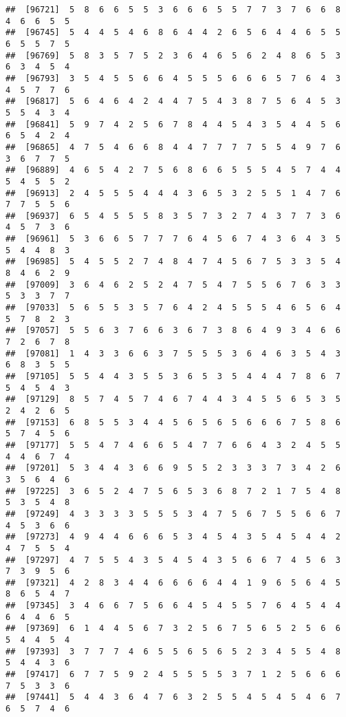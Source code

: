 \documentclass[
]{book}
\begin{document}
\begin{verbatim}
##  [96721]  5  8  6  6  5  5  3  6  6  6  5  5  7  7  3  7  6  6  8  4  6  6  5  5
##  [96745]  5  4  4  5  4  6  8  6  4  4  2  6  5  6  4  4  6  5  5  6  5  5  7  5
##  [96769]  5  8  3  5  7  5  2  3  6  4  6  5  6  2  4  8  6  5  3  6  3  4  5  4
##  [96793]  3  5  4  5  5  6  6  4  5  5  5  6  6  6  5  7  6  4  3  4  5  7  7  6
##  [96817]  5  6  4  6  4  2  4  4  7  5  4  3  8  7  5  6  4  5  3  5  5  4  3  4
##  [96841]  5  9  7  4  2  5  6  7  8  4  4  5  4  3  5  4  4  5  6  6  5  4  2  4
##  [96865]  4  7  5  4  6  6  8  4  4  7  7  7  7  5  5  4  9  7  6  3  6  7  7  5
##  [96889]  4  6  5  4  2  7  5  6  8  6  6  5  5  5  4  5  7  4  4  5  4  5  5  2
##  [96913]  2  4  5  5  5  4  4  4  3  6  5  3  2  5  5  1  4  7  6  7  7  5  5  6
##  [96937]  6  5  4  5  5  5  8  3  5  7  3  2  7  4  3  7  7  3  6  4  5  7  3  6
##  [96961]  5  3  6  6  5  7  7  7  6  4  5  6  7  4  3  6  4  3  5  5  4  4  8  3
##  [96985]  5  4  5  5  2  7  4  8  4  7  4  5  6  7  5  3  3  5  4  8  4  6  2  9
##  [97009]  3  6  4  6  2  5  2  4  7  5  4  7  5  5  6  7  6  3  3  5  3  3  7  7
##  [97033]  5  6  5  5  3  5  7  6  4  2  4  5  5  5  4  6  5  6  4  5  7  8  2  3
##  [97057]  5  5  6  3  7  6  6  3  6  7  3  8  6  4  9  3  4  6  6  7  2  6  7  8
##  [97081]  1  4  3  3  6  6  3  7  5  5  5  3  6  4  6  3  5  4  3  6  8  3  5  5
##  [97105]  5  5  4  4  3  5  5  3  6  5  3  5  4  4  4  7  8  6  7  5  4  5  4  3
##  [97129]  8  5  7  4  5  7  4  6  7  4  4  3  4  5  5  6  5  3  5  2  4  2  6  5
##  [97153]  6  8  5  5  3  4  4  5  6  5  6  5  6  6  6  7  5  8  6  5  7  4  5  6
##  [97177]  5  5  4  7  4  6  6  5  4  7  7  6  6  4  3  2  4  5  5  4  4  6  7  4
##  [97201]  5  3  4  4  3  6  6  9  5  5  2  3  3  3  7  3  4  2  6  3  5  6  4  6
##  [97225]  3  6  5  2  4  7  5  6  5  3  6  8  7  2  1  7  5  4  8  5  3  5  4  8
##  [97249]  4  3  3  3  3  5  5  5  3  4  7  5  6  7  5  5  6  6  7  4  5  3  6  6
##  [97273]  4  9  4  4  6  6  6  5  3  4  5  4  3  5  4  5  4  4  2  4  7  5  5  4
##  [97297]  4  7  5  5  4  3  5  4  5  4  3  5  6  6  7  4  5  6  3  7  3  9  5  6
##  [97321]  4  2  8  3  4  4  6  6  6  6  4  4  1  9  6  5  6  4  5  8  6  5  4  7
##  [97345]  3  4  6  6  7  5  6  6  4  5  4  5  5  7  6  4  5  4  4  6  4  4  6  5
##  [97369]  6  1  4  4  5  6  7  3  2  5  6  7  5  6  5  2  5  6  6  5  4  4  5  4
##  [97393]  3  7  7  7  4  6  5  5  6  5  6  5  2  3  4  5  5  4  8  5  4  4  3  6
##  [97417]  6  7  7  5  9  2  4  5  5  5  5  3  7  1  2  5  6  6  6  7  5  3  3  6
##  [97441]  5  4  4  3  6  4  7  6  3  2  5  5  4  5  4  5  4  6  7  6  5  7  4  6

\end{verbatim}
\end{document}
